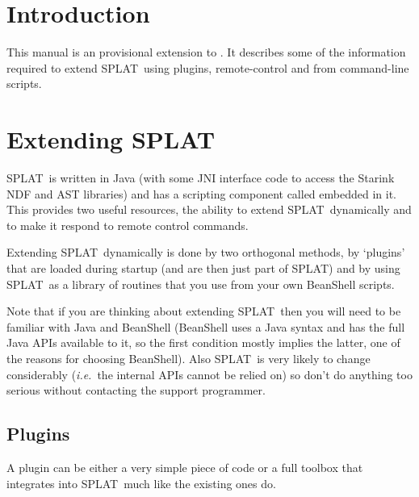 \documentclass[twoside,11pt,nolof]{starlink}
\providecommand{\SPLAT}{\textsf{SPLAT}}
\providecommand{\ie}{\textit{i.e.}}
\begin{document}
\ifpdf
\else
\fi

\scfrontmatter


\section{Introduction}

This manual is an provisional extension to
. It describes some of the information
required to extend \SPLAT\ using plugins, remote-control and from
command-line scripts.

\section{Extending \SPLAT}

\SPLAT\ is written in Java (with some JNI interface code to access the
Starink NDF and AST libraries) and has a scripting component called
embedded in it. This provides two useful resources, the ability to
extend \SPLAT\ dynamically and to make it respond to remote
control commands.

Extending \SPLAT\ dynamically is done by two orthogonal methods, by
`plugins' that are loaded during startup (and are then just part of
\SPLAT) and by using \SPLAT\ as a
library of routines that you use from your own BeanShell scripts.

Note that if you are thinking about extending \SPLAT\ then you will
need to be familiar with Java and BeanShell (BeanShell uses a Java
syntax and has the full Java APIs available to it, so the first
condition mostly implies the latter, one of the reasons for choosing
BeanShell). Also \SPLAT\ is very likely to change considerably (\ie\
the internal APIs cannot be relied on) so don't do anything too
serious without contacting the support programmer.

\subsection{Plugins}

A plugin can be either a very simple piece of code or a full toolbox
that integrates into \SPLAT\ much like the existing ones do.
\end{document}
